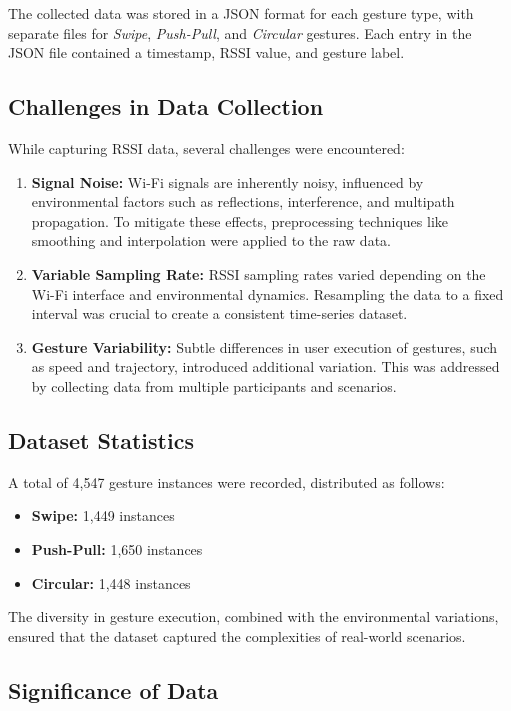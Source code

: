 \documentclass[10pt,twocolumn,letterpaper]{article}
\begin{document}
The collected data was stored in a JSON format for each gesture type, with separate files for \textit{Swipe}, \textit{Push-Pull}, and \textit{Circular} gestures. Each entry in the JSON file contained a timestamp, RSSI value, and gesture label.

\subsection{Challenges in Data Collection}

While capturing RSSI data, several challenges were encountered:

\begin{enumerate}
    \item \textbf{Signal Noise:} Wi-Fi signals are inherently noisy, influenced by environmental factors such as reflections, interference, and multipath propagation. To mitigate these effects, preprocessing techniques like smoothing and interpolation were applied to the raw data.
    \item \textbf{Variable Sampling Rate:} RSSI sampling rates varied depending on the Wi-Fi interface and environmental dynamics. Resampling the data to a fixed interval was crucial to create a consistent time-series dataset.
    \item \textbf{Gesture Variability:} Subtle differences in user execution of gestures, such as speed and trajectory, introduced additional variation. This was addressed by collecting data from multiple participants and scenarios.
\end{enumerate}

\subsection{Dataset Statistics}

A total of 4,547 gesture instances were recorded, distributed as follows:
\begin{itemize}
    \item \textbf{Swipe:} 1,449 instances
    \item \textbf{Push-Pull:} 1,650 instances
    \item \textbf{Circular:} 1,448 instances
\end{itemize}

The diversity in gesture execution, combined with the environmental variations, ensured that the dataset captured the complexities of real-world scenarios.

\subsection{Significance of Data}
\end{document}
